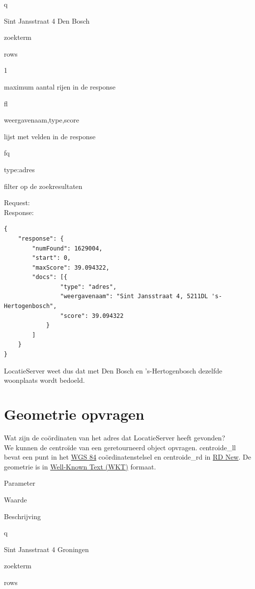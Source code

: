 \documentclass[]{book}
\begin{document}
{q}

{Sint Jansstraat 4 Den Bosch}

zoekterm

{rows}

{1}

maximum aantal rijen in de response

{fl}

{weergavenaam,type,score}

lijst met velden in de response

{fq}

{type:adres}

filter op de zoekresultaten

Request:\\

Response:

\begin{verbatim}
{
    "response": {
        "numFound": 1629004,
        "start": 0,
        "maxScore": 39.094322,
        "docs": [{
                "type": "adres",
                "weergavenaam": "Sint Jansstraat 4, 5211DL 's-Hertogenbosch",
                "score": 39.094322
            }
        ]
    }
}
\end{verbatim}

LocatieServer weet dus dat met Den Bosch en 's-Hertogenbosch dezelfde woonplaats wordt bedoeld.

\hypertarget{geometrie-opvragen}{%
\section{Geometrie opvragen}\label{geometrie-opvragen}}

Wat zijn de coördinaten van het adres dat LocatieServer heeft gevonden?\\
We kunnen de centroïde van een geretourneerd object opvragen. {centroide\_ll} bevat een punt in het \href{https://nl.wikipedia.org/wiki/WGS_84}{WGS 84} coördinatenstelsel en {centroide\_rd} in \href{https://nl.wikipedia.org/wiki/Rijksdriehoeksco\%C3\%B6rdinaten}{RD New}. De geometrie is in \href{https://en.wikipedia.org/wiki/Well-known_text_representation_of_geometry}{Well-Known Text (WKT)} formaat.

Parameter

Waarde

Beschrijving

{q}

{Sint Jansstraat 4 Groningen}

zoekterm

{rows}
\end{document}
